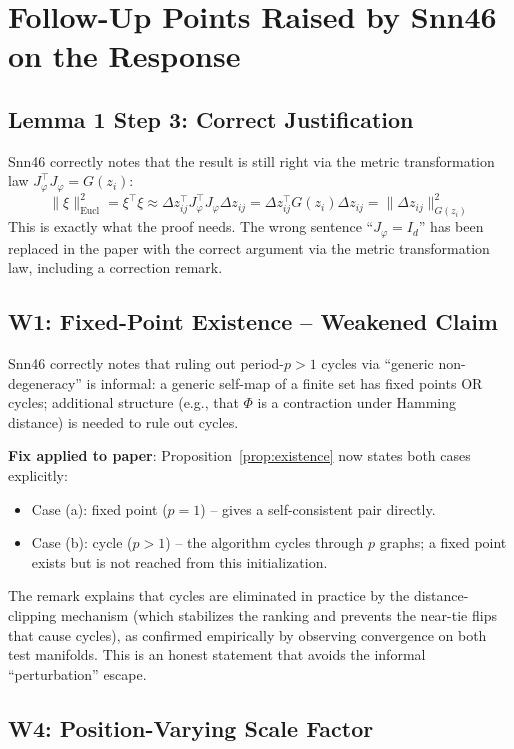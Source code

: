 \documentclass{article}
\begin{document}
\section{Follow-Up Points Raised by Snn46 on the Response}

\subsection{Lemma 1 Step 3: Correct Justification}

Snn46 correctly notes that the result is still right via the metric
transformation law $J_\varphi^\top J_\varphi = G(z_i)$:
\[
  \|\xi\|_{\mathrm{Eucl}}^2 = \xi^\top\xi
  \approx \Delta z_{ij}^\top J_\varphi^\top J_\varphi \Delta z_{ij}
  = \Delta z_{ij}^\top G(z_i) \Delta z_{ij}
  = \|\Delta z_{ij}\|_{G(z_i)}^2
\]
This is exactly what the proof needs. The wrong sentence ``$J_\varphi = I_d$''
has been replaced in the paper with the correct argument via the metric
transformation law, including a correction remark.

\subsection{W1: Fixed-Point Existence -- Weakened Claim}

Snn46 correctly notes that ruling out period-$p > 1$ cycles via ``generic
non-degeneracy'' is informal: a generic self-map of a finite set has fixed
points OR cycles; additional structure (e.g., that $\Phi$ is a contraction
under Hamming distance) is needed to rule out cycles.

\textbf{Fix applied to paper}: Proposition~\ref{prop:existence} now states
both cases explicitly:
\begin{itemize}
  \item Case (a): fixed point ($p=1$) -- gives a self-consistent pair directly.
  \item Case (b): cycle ($p>1$) -- the algorithm cycles through $p$ graphs;
    a fixed point exists but is not reached from this initialization.
\end{itemize}
The remark explains that cycles are eliminated in practice by the distance-clipping
mechanism (which stabilizes the ranking and prevents the near-tie flips that
cause cycles), as confirmed empirically by observing convergence on both
test manifolds. This is an honest statement that avoids the informal
``perturbation'' escape.

\subsection{W4: Position-Varying Scale Factor}
\end{document}
